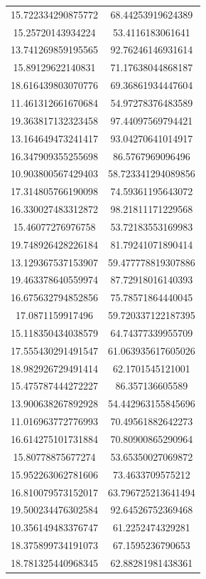 \begin{table}
\begin{tabular}{cc}
15.722334290875772 & 68.44253919624389 \\
15.25720143934224 & 53.4116183061641 \\
13.741269859195565 & 92.76246146931614 \\
15.89129622140831 & 71.17638044868187 \\
18.616439803070776 & 69.36861934447604 \\
11.461312661670684 & 54.97278376483589 \\
19.363817132323458 & 97.44097569794421 \\
13.164649473241417 & 93.04270641014917 \\
16.347909355255698 & 86.5767969096496 \\
10.903800567429403 & 58.723341294089856 \\
17.314805766190098 & 74.59361195643072 \\
16.330027483312872 & 98.21811171229568 \\
15.46077276976758 & 53.72183553169983 \\
19.748926428226184 & 81.79241071890414 \\
13.129367537153907 & 59.477778819307886 \\
19.463378640559974 & 87.72918016140393 \\
16.675632794852856 & 75.78571864440045 \\
17.0871159917496 & 59.720337122187395 \\
15.118350434038579 & 64.74377339955709 \\
17.555430291491547 & 61.063935617605026 \\
18.982926729491414 & 62.1701545121001 \\
15.475787444272227 & 86.357136605589 \\
13.900638267892928 & 54.442963155845696 \\
11.016963772776993 & 70.49561882642273 \\
16.614275101731884 & 70.80900865290964 \\
15.80778875677274 & 53.65350027069872 \\
15.952263062781606 & 73.4633709575212 \\
16.810079573152017 & 63.796725213641494 \\
19.500234476302584 & 92.64526752369468 \\
10.356149483376747 & 61.2252474329281 \\
18.375899734191073 & 67.1595236790653 \\
18.781325440968345 & 62.88281981438361 \\

\end{tabular}
\end{table}
